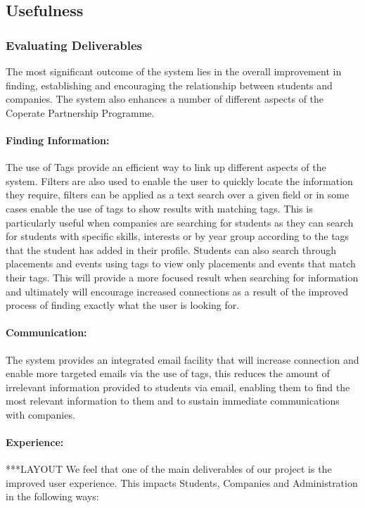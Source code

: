 \subsection{Usefulness}
\subsubsection{Evaluating Deliverables}
  The most significant outcome of the system lies in the overall improvement in finding, establishing and encouraging the relationship between students and companies. The system also enhances a number of different aspects of the Coperate Partnership Programme.

\paragraph{Finding Information:}
  The use of Tags provide an efficient way to link up different aspects of the system. Filters are also used to enable the user to quickly locate the information they require, filters can be applied as a text search over a given field or in some cases enable the use of tags to show results with matching tags. This is particularly useful when companies are searching for students as they can search for students with specific skills, interests or by year group according to the tags that the student has added in their profile. Students can also search through placements and events using tags to view only placements and events that match their tags. This will provide a more focused result when searching for information and ultimately will encourage increased connections as a result of the improved process of finding exactly what the user is looking for.

\paragraph{Communication:}
  The system provides an integrated email facility that will increase connection and enable more targeted emails via the use of tags, this reduces the amount of irrelevant information provided to students via email, enabling them to find the most relevant information to them and to sustain immediate communications with companies.

\paragraph{Experience:}
  ***LAYOUT We feel that one of the main deliverables of our project is the improved user experience. This impacts Students, Companies and Administration in the following ways:

